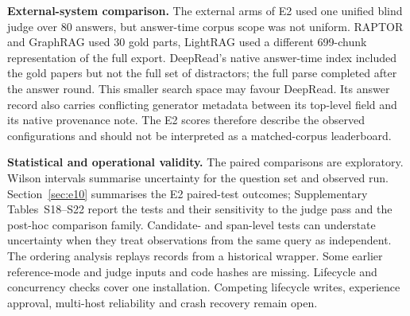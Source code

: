 \noindent\textbf{External-system comparison.} The external arms of E2 used
one unified blind judge over 80 answers, but answer-time corpus scope was
not uniform. RAPTOR and GraphRAG used 30 gold parts, LightRAG used a
different 699-chunk representation of the full export. DeepRead's native
answer-time index included the gold papers but not the full set of
distractors; the full parse completed after the answer round. This smaller
search space may favour DeepRead. Its answer record also carries conflicting
generator metadata between its top-level field and its native provenance
note. The E2 scores therefore describe the observed
configurations and should not be interpreted as a matched-corpus
leaderboard.

\noindent\textbf{Statistical and operational validity.} The paired
comparisons are exploratory. Wilson intervals summarise uncertainty for
the question set and observed run. Section~\ref{sec:e10} summarises the E2
paired-test outcomes; Supplementary Tables~S18--S22 report the tests and
their sensitivity to the judge pass and the post-hoc comparison family. Candidate- and span-level tests can
understate uncertainty when they treat observations from the same query as
independent. The ordering analysis replays records from a historical
wrapper. Some earlier reference-mode and judge inputs and code hashes are
missing. Lifecycle and concurrency checks cover one installation.
Competing lifecycle writes, experience approval, multi-host reliability
and crash recovery remain open.